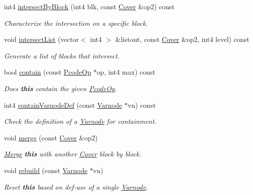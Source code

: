 \begin{DoxyCompactItemize}
int4 \mbox{\hyperlink{class_cover_acdd4be001eb6eda1bf9c6fe35c834736}{intersect\+By\+Block}} (int4 blk, const \mbox{\hyperlink{class_cover}{Cover}} \&op2) const
\begin{DoxyCompactList}\small\item\em Characterize the intersection on a specific block. \end{DoxyCompactList}\item 
void \mbox{\hyperlink{class_cover_ab5c8fdd8ca6d89f0d8fd8fde1170f92c}{intersect\+List}} (vector$<$ int4 $>$ \&listout, const \mbox{\hyperlink{class_cover}{Cover}} \&op2, int4 level) const
\begin{DoxyCompactList}\small\item\em Generate a list of blocks that intersect. \end{DoxyCompactList}\item 
bool \mbox{\hyperlink{class_cover_a5db9b2042d36daf2bead4a47bddd8349}{contain}} (const \mbox{\hyperlink{class_pcode_op}{Pcode\+Op}} $\ast$op, int4 max) const
\begin{DoxyCompactList}\small\item\em Does {\bfseries{this}} contain the given \mbox{\hyperlink{class_pcode_op}{Pcode\+Op}}. \end{DoxyCompactList}\item 
int4 \mbox{\hyperlink{class_cover_a56984085c138cc78b1544590d82fd872}{contain\+Varnode\+Def}} (const \mbox{\hyperlink{class_varnode}{Varnode}} $\ast$vn) const
\begin{DoxyCompactList}\small\item\em Check the definition of a \mbox{\hyperlink{class_varnode}{Varnode}} for containment. \end{DoxyCompactList}\item 
void \mbox{\hyperlink{class_cover_a222e454f0fbb979032978828e97fc8ef}{merge}} (const \mbox{\hyperlink{class_cover}{Cover}} \&op2)
\begin{DoxyCompactList}\small\item\em \mbox{\hyperlink{class_merge}{Merge}} {\bfseries{this}} with another \mbox{\hyperlink{class_cover}{Cover}} block by block. \end{DoxyCompactList}\item 
void \mbox{\hyperlink{class_cover_a1d437f9e8a60e407587935411ed6d546}{rebuild}} (const \mbox{\hyperlink{class_varnode}{Varnode}} $\ast$vn)
\begin{DoxyCompactList}\small\item\em Reset {\bfseries{this}} based on def-\/use of a single \mbox{\hyperlink{class_varnode}{Varnode}}. \end{DoxyCompactList}\item 

\end{DoxyCompactItemize}
